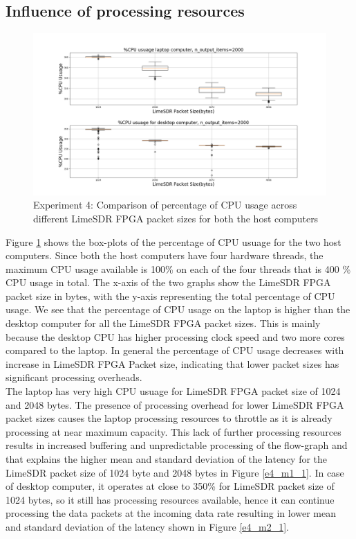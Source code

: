 \subsection{Influence of processing resources}
\begin{figure}[h!]
\centering
\includegraphics[width=\textwidth]{Thesis/Figure/E4_CPU.png}
\caption{Experiment 4: Comparison of percentage of CPU usage across different LimeSDR FPGA packet sizes for both the host computers}
\label{e4_cpu}
\end{figure}

Figure \ref{e4_cpu} shows the box-plots of the percentage of CPU usuage for the two host computers.
Since both the host computers have four hardware threads, the maximum CPU usage available is 100\% on each of the four threads that is 400 \% CPU usage in total.
The x-axis of the two graphs show the LimeSDR FPGA packet size in bytes, with the y-axis representing the total percentage of CPU usage.
We see that the percentage of CPU usage on the laptop is higher than the desktop computer for all the LimeSDR FPGA packet sizes.
This is mainly because the desktop CPU has higher processing clock speed and two more cores compared to the laptop.
In general the percentage of CPU usage decreases with increase in LimeSDR FPGA Packet size, indicating that lower packet sizes has significant processing overheads. \\

The laptop has very high CPU usuage for LimeSDR FPGA packet size of 1024 and 2048 bytes. The presence of processing overhead for lower LimeSDR FPGA packet sizes causes the laptop processing resources to throttle as it is already processing at near maximum capacity.
This lack of further processing resources results in increased buffering and unpredictable processing of the flow-graph and that explains the higher mean and standard deviation of the latency for the LimeSDR packet size of 1024 byte and 2048 bytes in Figure \ref{e4_m1_1}.
In case of desktop computer, it operates at close to 350\% for LimeSDR packet size of 1024 bytes, so it still has processing resources available, hence it can continue processing the data packets at the incoming data rate resulting in lower mean and standard deviation of the latency shown in Figure \ref{e4_m2_1}.

